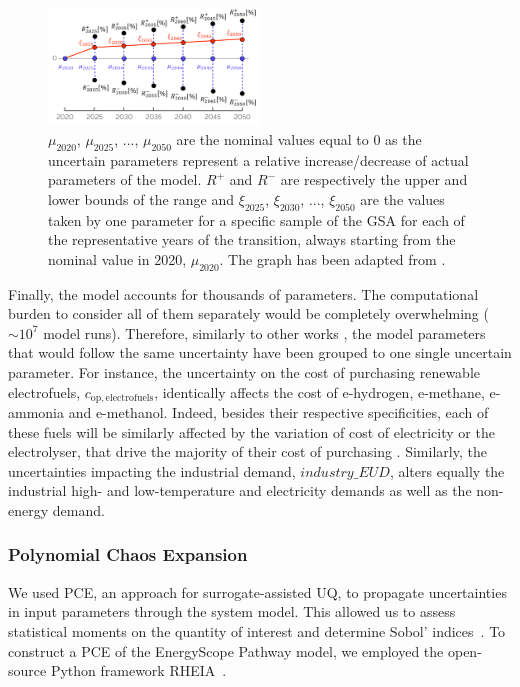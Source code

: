 \documentclass[11pt,twoside,a4paper,english]{article}
\begin{document}
\begin{appendices}
\begin{figure}[htbp!]
\centering
\includegraphics[width=0.5\textwidth]{ranges_transition.pdf}
\caption{$\mu_{2020}$, $\mu_{2025}$, ...,  $\mu_{2050}$ are the nominal values equal to 0 as the uncertain parameters represent a relative increase/decrease of actual parameters of the model. $R^+$ and $R^-$ are respectively the upper and lower bounds of the range and $\xi_{2025}$, $\xi_{2030}$, ...,  $\xi_{2050}$ are the values taken by one parameter for a specific sample of the \gls{GSA} for each of the representative years of the transition, always starting from the nominal value in 2020, $\mu_{2020}$. The graph has been adapted from \cite{guevara2022modeling}.}
\label{fig:ranges_transition}
\end{figure}

Finally, the model accounts for thousands of parameters. The computational burden to consider all of them separately would be completely overwhelming ($\sim 10^7$ model runs). Therefore, similarly to other works \cite{Moret2017,limpens2020impact}, the model parameters that would follow the same uncertainty have been grouped to one single uncertain parameter. For instance, the uncertainty on the cost of purchasing renewable electrofuels, $c_{\mathrm{op,electrofuels}}$, identically affects the cost of e-hydrogen, e-methane, e-ammonia and e-methanol. Indeed, besides their respective specificities, each of these fuels will be similarly affected by the variation of cost of electricity or the electrolyser, that drive the majority of their cost of purchasing \cite{h2coalition}. Similarly, the uncertainties impacting the industrial demand, $industry\_EUD$, alters equally the industrial high- and low-temperature and electricity demands as well as the non-energy demand.

\subsubsection{Polynomial Chaos Expansion}
\label{subsubsec:UQ:PCE}
We used \gls{PCE}, an approach for surrogate-assisted \gls{UQ}, to propagate uncertainties in input parameters through the system model. This allowed us to assess statistical moments on the quantity of interest and determine Sobol' indices~\cite{coppitters2020robust}. To construct a PCE of the EnergyScope Pathway model, we employed the open-source Python framework RHEIA~\cite{coppitters2022rheia,readthedocs_rheia}.\par


\end{appendices}
\end{document}
